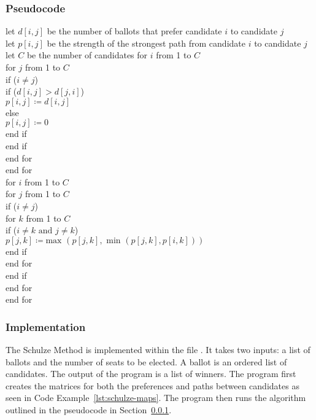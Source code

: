 \documentclass[12pt]{article}
\begin{document}
\subsubsection{Pseudocode}
\label{alg:schulze psuedocode}
let $d[i,j]$ be the number of ballots that prefer candidate $i$ to candidate $j$\\
let $p[i,j]$ be the strength of the strongest path from candidate $i$ to candidate $j$\\
let $C$ be the number of candidates
for $i$ from 1 to $C$\\
\tab for $j$ from 1 to $C$\\
\tab\tab if ($i \ne j$)\\
\tab\tab\tab if ($d[i,j] > d[j,i]$)\\
\tab\tab\tab\tab $p[i,j] \coloneqq d[i,j]$\\
\tab\tab\tab else\\
\tab\tab\tab\tab $p[i,j] \coloneqq 0$\\
\tab\tab\tab end if \\
\tab\tab end if \\
\tab end for \\
end for\\
for $i$ from 1 to $C$\\
\tab for $j$ from 1 to $C$\\
\tab\tab if ($i \ne j$)\\
\tab\tab\tab for $k$ from 1 to $C$\\
\tab\tab\tab\tab if ($i \ne k \text{ and } j \ne k$)\\
\tab\tab\tab\tab\tab $p[j,k] \coloneqq \text{max }(p[j,k], \text{ min }(p[j,k], p[i,k]))$\\
\tab\tab\tab\tab end if \\
\tab\tab\tab end for \\
\tab\tab end if \\
\tab end for \\
end for\\
\subsubsection{Implementation}
The Schulze Method is implemented within the file . It takes two inputs: a list of ballots and the number of seats to be elected. A ballot is an ordered list of candidates. The output of the program is a list of winners. The program first creates the matrices for both the preferences and paths between candidates as seen in Code Example~\ref{lst:schulze-maps}.
The program then runs the algorithm outlined in the pseudocode in Section~\ref{alg:schulze psuedocode}.
\end{document}
